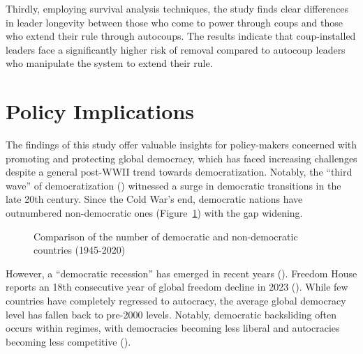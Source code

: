 \documentclass[
  12pt,
]{report}
\begin{document}
Thirdly, employing survival analysis techniques, the study finds clear
differences in leader longevity between those who come to power through
coups and those who extend their rule through autocoups. The results
indicate that coup-installed leaders face a significantly higher risk of
removal compared to autocoup leaders who manipulate the system to extend
their rule.

\section{Policy Implications}\label{policy-implications}

The findings of this study offer valuable insights for policy-makers
concerned with promoting and protecting global democracy, which has
faced increasing challenges despite a general post-WWII trend towards
democratization. Notably, the ``third wave'' of democratization
()
witnessed a surge in democratic transitions in the late 20th century.
Since the Cold War's end, democratic nations have outnumbered
non-democratic ones (Figure~\ref{fig-democracy}) with the gap widening.

\begin{figure}


\caption{\label{fig-democracy}Comparison of the number of democratic and
non-democratic countries (1945-2020)}

\end{figure}%

However, a ``democratic recession'' has emerged in recent years
(). Freedom House reports an
18th consecutive year of global freedom decline in 2023
(). While few
countries have completely regressed to autocracy, the average global
democracy level has fallen back to pre-2000 levels. Notably, democratic
backsliding often occurs within regimes, with democracies becoming less
liberal and autocracies becoming less competitive
().
\end{document}
